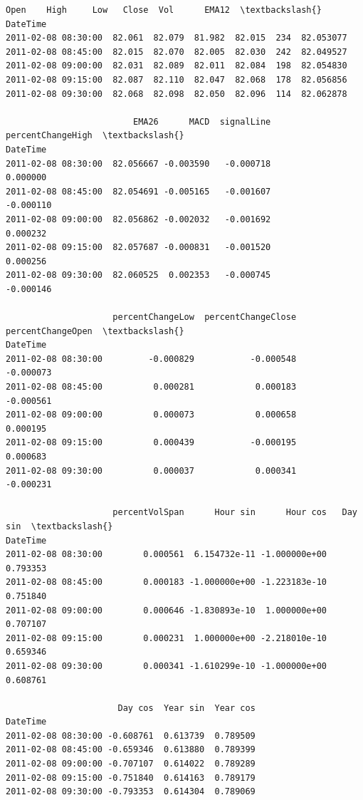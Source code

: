 \documentclass[11pt]{article}
\makeatletter
\newcommand{\boxspacing}{\kern\kvtcb@left@rule\kern\kvtcb@boxsep}
\newcommand{\prompt}[4]{
        {\ttfamily\llap{{\color{#2}[#3]:\hspace{3pt}#4}}\vspace{-\baselineskip}}
    }
\makeatother
\begin{document}
            \begin{tcolorbox}[breakable, size=fbox, boxrule=.5pt, pad at break*=1mm, opacityfill=0]
\prompt{Out}{outcolor}{24}{\boxspacing}
\begin{Verbatim}[commandchars=\\\{\}]
                       Open    High     Low   Close  Vol      EMA12  \textbackslash{}
DateTime
2011-02-08 08:30:00  82.061  82.079  81.982  82.015  234  82.053077
2011-02-08 08:45:00  82.015  82.070  82.005  82.030  242  82.049527
2011-02-08 09:00:00  82.031  82.089  82.011  82.084  198  82.054830
2011-02-08 09:15:00  82.087  82.110  82.047  82.068  178  82.056856
2011-02-08 09:30:00  82.068  82.098  82.050  82.096  114  82.062878

                         EMA26      MACD  signalLine  percentChangeHigh  \textbackslash{}
DateTime
2011-02-08 08:30:00  82.056667 -0.003590   -0.000718           0.000000
2011-02-08 08:45:00  82.054691 -0.005165   -0.001607          -0.000110
2011-02-08 09:00:00  82.056862 -0.002032   -0.001692           0.000232
2011-02-08 09:15:00  82.057687 -0.000831   -0.001520           0.000256
2011-02-08 09:30:00  82.060525  0.002353   -0.000745          -0.000146

                     percentChangeLow  percentChangeClose  percentChangeOpen  \textbackslash{}
DateTime
2011-02-08 08:30:00         -0.000829           -0.000548          -0.000073
2011-02-08 08:45:00          0.000281            0.000183          -0.000561
2011-02-08 09:00:00          0.000073            0.000658           0.000195
2011-02-08 09:15:00          0.000439           -0.000195           0.000683
2011-02-08 09:30:00          0.000037            0.000341          -0.000231

                     percentVolSpan      Hour sin      Hour cos   Day sin  \textbackslash{}
DateTime
2011-02-08 08:30:00        0.000561  6.154732e-11 -1.000000e+00  0.793353
2011-02-08 08:45:00        0.000183 -1.000000e+00 -1.223183e-10  0.751840
2011-02-08 09:00:00        0.000646 -1.830893e-10  1.000000e+00  0.707107
2011-02-08 09:15:00        0.000231  1.000000e+00 -2.218010e-10  0.659346
2011-02-08 09:30:00        0.000341 -1.610299e-10 -1.000000e+00  0.608761

                      Day cos  Year sin  Year cos
DateTime
2011-02-08 08:30:00 -0.608761  0.613739  0.789509
2011-02-08 08:45:00 -0.659346  0.613880  0.789399
2011-02-08 09:00:00 -0.707107  0.614022  0.789289
2011-02-08 09:15:00 -0.751840  0.614163  0.789179
2011-02-08 09:30:00 -0.793353  0.614304  0.789069
\end{Verbatim}
\end{tcolorbox}
        
\end{document}
